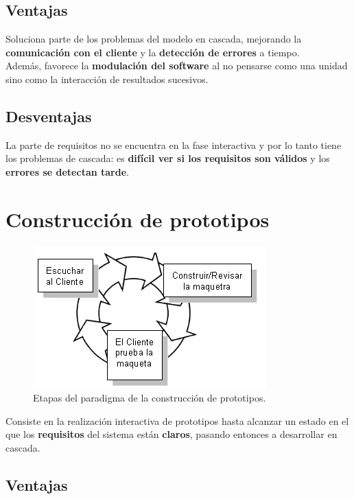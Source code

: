 \subsection{Ventajas}
Soluciona parte de los problemas del modelo en cascada, mejorando la \textbf{comunicación con el cliente} y la \textbf{detección de errores} a tiempo.\\
Además, favorece la \textbf{modulación del software} al no pensarse como una unidad sino como la interacción de resultados sucesivos.\\

\subsection{Desventajas}
La parte de requisitos no se encuentra en la fase interactiva y por lo tanto tiene los problemas de cascada: es \textbf{difícil ver si los requisitos son válidos} y los \textbf{errores se detectan tarde}.





 \section{Construcción de prototipos}
 \begin{figure}[H]
  \centering
  \includegraphics[width=0.7\linewidth]{Resources/construccionPrototipos.png}
  \caption{Etapas del paradigma de la construcción de prototipos.}
  \label{fig:construccionPrototipos}
\end{figure}

Consiste en la realización interactiva de prototipos hasta alcanzar un estado en el que los \textbf{requisitos} del sistema están \textbf{claros}, pasando entonces a desarrollar en cascada.\\


\subsection{Ventajas}

